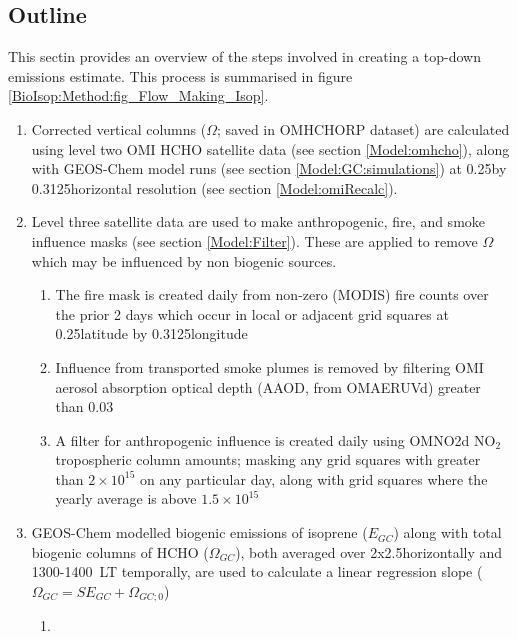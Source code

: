   \subsection{Outline}
    This sectin provides an overview of the steps involved in creating a top-down emissions estimate. %
    This process is summarised in figure \ref{BioIsop:Method:fig_Flow_Making_Isop}.
    \begin{enumerate}
      \item 
        Corrected vertical columns ($\Omega$; saved in OMHCHORP dataset) are calculated using level two OMI HCHO satellite data (see section \ref{Model:omhcho}), along with GEOS-Chem model runs (see section \ref{Model:GC:simulations}) at 0.25\degr by 0.3125\degr horizontal resolution (see section \ref{Model:omiRecalc}).
      \item 
        Level three satellite data are used to make anthropogenic, fire, and smoke influence masks (see section \ref{Model:Filter}).
        These are applied to remove $\Omega$ which may be influenced by non biogenic sources. 
      \begin{enumerate}
        \item 
          The fire mask is created daily from non-zero (MODIS) fire counts over the prior 2 days which occur in local or adjacent grid squares at 0.25\degr latitude by 0.3125\degr longitude
        \item 
          Influence from transported smoke plumes is removed by filtering OMI aerosol absorption optical depth (AAOD, from OMAERUVd) greater than 0.03
        \item 
          A filter for anthropogenic influence is created daily using OMNO2d NO$_2$ tropospheric column amounts; masking any grid squares with greater than $2\times 10 ^{15}$ on any particular day, along with grid squares where the yearly average is above $1.5 \times 10^{15}$\moleccm
      \end{enumerate}
      \item 
        GEOS-Chem modelled biogenic emissions of isoprene ($E_{GC}$) along with total biogenic columns of HCHO ($\Omega_{GC}$), both averaged over 2x2.5\degr horizontally  and 1300-1400~LT temporally, are used to calculate a linear regression slope ($\Omega_{GC}=S E_{GC} + \Omega_{GC;0}$)
        \begin{enumerate}
          \item 

\end{enumerate}
\end{enumerate}
